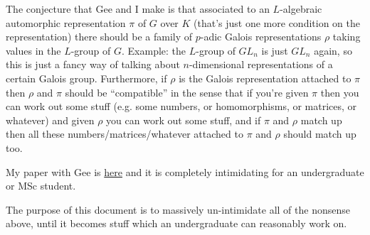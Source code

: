 \documentclass{amsart}
\begin{document}
The conjecture that Gee and I make is that associated to an $L$-algebraic automorphic representation $\pi$ of $G$ over $K$ (that's just one more condition on the representation) there should be a family of $p$-adic Galois representations $\rho$ taking values in the $L$-group of $G$. Example: the $L$-group of $GL_n$ is just $GL_n$ again, so this is just a fancy way of talking about $n$-dimensional representations of a certain Galois group. Furthermore, if $\rho$ is the Galois representation attached to $\pi$ then $\rho$ and $\pi$ should be ``compatible'' in the sense that if you're given $\pi$ then you can work out some stuff (e.g. some numbers, or homomorphisms, or matrices, or whatever) and given $\rho$ you can work out some stuff, and if $\pi$ and $\rho$ match up then all these numbers/matrices/whatever attached to $\pi$ and $\rho$ should match up too.

My paper with Gee is \href{https://arxiv.org/abs/1009.0785}{here} and it is completely intimidating for an undergraduate or MSc student.

The purpose of this document is to massively un-intimidate all of the nonsense above, until it becomes stuff which an undergraduate can reasonably work on.
\end{document}
